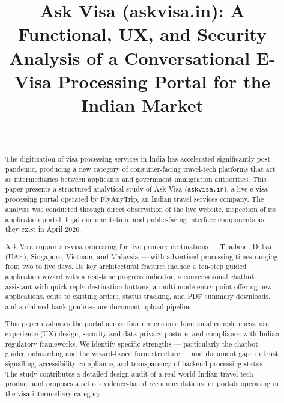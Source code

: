 \documentclass[journal, 10pt, twoside]{IEEEtran}
\begin{document}
\title{Ask Visa (askvisa.in): A Functional, UX, and Security Analysis
of a Conversational E-Visa Processing Portal for the Indian Market}

\author{%
  \\
}

\maketitle

\begin{abstract}
The digitization of visa processing services in India has accelerated
significantly post-pandemic, producing a new category of consumer-facing
travel-tech platforms that act as intermediaries between applicants and
government immigration authorities. This paper presents a structured
analytical study of Ask Visa (\texttt{askvisa.in}), a live e-visa
processing portal operated by FlyAnyTrip, an Indian travel services
company. The analysis was conducted through direct observation of the
live website, inspection of its application portal, legal documentation,
and public-facing interface components as they exist in April 2026.

Ask Visa supports e-visa processing for five primary destinations ---
Thailand, Dubai (UAE), Singapore, Vietnam, and Malaysia --- with
advertised processing times ranging from two to five days. Its key
architectural features include a ten-step guided application wizard with
a real-time progress indicator, a conversational chatbot assistant with
quick-reply destination buttons, a multi-mode entry point offering new
applications, edits to existing orders, status tracking, and PDF summary
downloads, and a claimed bank-grade secure document upload pipeline.

This paper evaluates the portal across four dimensions: functional
completeness, user experience (UX) design, security and data privacy
posture, and compliance with Indian regulatory frameworks. We identify
specific strengths --- particularly the chatbot-guided onboarding and
the wizard-based form structure --- and document gaps in trust signalling,
accessibility compliance, and transparency of backend processing status.
The study contributes a detailed design audit of a real-world Indian
travel-tech product and proposes a set of evidence-based recommendations
for portals operating in the visa intermediary category.
\end{abstract}
\end{document}
